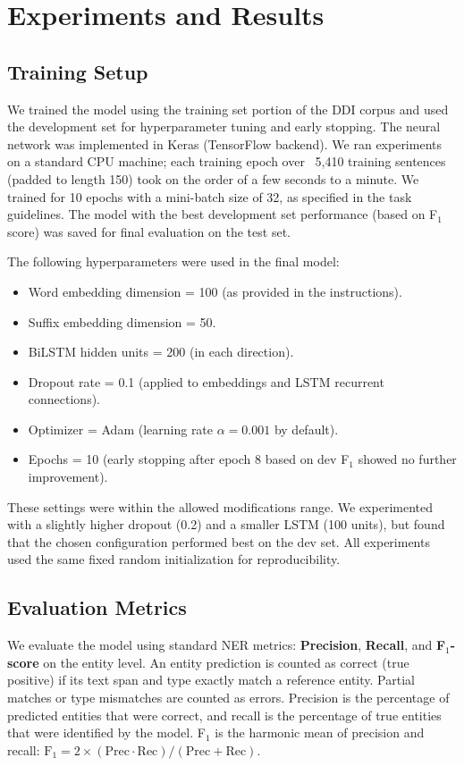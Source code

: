 \section{Experiments and Results}
\subsection{Training Setup}
We trained the model using the training set portion of the DDI corpus and used the development set for hyperparameter tuning and early stopping. The neural network was implemented in Keras (TensorFlow backend). We ran experiments on a standard CPU machine; each training epoch over ~5,410 training sentences (padded to length 150) took on the order of a few seconds to a minute. We trained for 10 epochs with a mini-batch size of 32, as specified in the task guidelines. The model with the best development set performance (based on F$_1$ score) was saved for final evaluation on the test set.

The following hyperparameters were used in the final model:
\begin{itemize}
    \item Word embedding dimension = 100 (as provided in the instructions).
    \item Suffix embedding dimension = 50.
    \item BiLSTM hidden units = 200 (in each direction).
    \item Dropout rate = 0.1 (applied to embeddings and LSTM recurrent connections).
    \item Optimizer = Adam (learning rate $\alpha=0.001$ by default).
    \item Epochs = 10 (early stopping after epoch 8 based on dev F$_1$ showed no further improvement).
\end{itemize}
These settings were within the allowed modifications range. We experimented with a slightly higher dropout (0.2) and a smaller LSTM (100 units), but found that the chosen configuration performed best on the dev set. All experiments used the same fixed random initialization for reproducibility.

\subsection{Evaluation Metrics}
We evaluate the model using standard NER metrics: \textbf{Precision}, \textbf{Recall}, and \textbf{F$_1$-score} on the entity level. An entity prediction is counted as correct (true positive) if its text span and type exactly match a reference entity. Partial matches or type mismatches are counted as errors. Precision is the percentage of predicted entities that were correct, and recall is the percentage of true entities that were identified by the model. F$_1$ is the harmonic mean of precision and recall: $\text{F}_1 = 2 \times (\text{Prec} \cdot \text{Rec}) / (\text{Prec}+\text{Rec})$.

